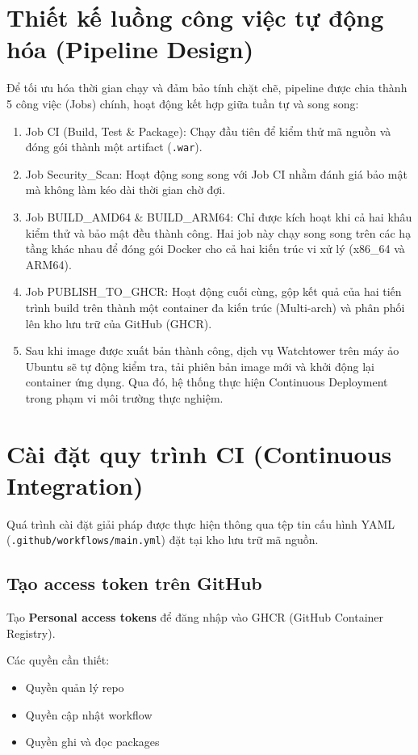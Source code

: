 \documentclass[12pt,a4paper,oneside]{extreport}
\begin{document}
\section{Thiết kế luồng công việc tự động hóa (Pipeline Design)}
Để tối ưu hóa thời gian chạy và đảm bảo tính chặt chẽ, pipeline được chia thành
5 công việc (Jobs) chính, hoạt động kết hợp giữa tuần tự và song song:
\begin{enumerate}
  \item Job CI (Build, Test \& Package): Chạy đầu tiên để kiểm thử mã nguồn và
  đóng gói thành một artifact (\texttt{.war}).
  \item Job Security\_Scan: Hoạt động song song với Job CI nhằm đánh giá bảo mật
  mà không làm kéo dài thời gian chờ đợi.
  \item Job BUILD\_AMD64 \& BUILD\_ARM64: Chỉ được kích hoạt khi cả hai khâu
  kiểm thử và bảo mật đều thành công. Hai job này chạy song song trên các hạ
  tầng khác nhau để đóng gói Docker cho cả hai kiến trúc vi xử lý (x86\_64 và
  ARM64).
  \item Job PUBLISH\_TO\_GHCR: Hoạt động cuối cùng, gộp kết quả của hai tiến
  trình build trên thành một container đa kiến trúc (Multi-arch) và phân phối
  lên kho lưu trữ của GitHub (GHCR).
  \item Sau khi image được xuất bản thành công, dịch vụ Watchtower trên máy ảo
  Ubuntu sẽ tự động kiểm tra, tải phiên bản image mới và khởi động lại container
  ứng dụng. Qua đó, hệ thống thực hiện Continuous Deployment trong phạm vi môi
  trường thực nghiệm.
\end{enumerate}

\section{Cài đặt quy trình CI (Continuous Integration)}
Quá trình cài đặt giải pháp được thực hiện thông qua tệp tin cấu hình YAML
(\texttt{.github/workflows/main.yml}) đặt tại kho lưu trữ mã nguồn.

\subsection{Tạo access token trên GitHub}
Tạo \textbf{Personal access tokens} để đăng nhập vào GHCR (GitHub Container
Registry).

Các quyền cần thiết:
\begin{itemize}
  \item Quyền quản lý repo
  \item Quyền cập nhật workflow
  \item Quyền ghi và đọc packages
\end{itemize}
\end{document}
